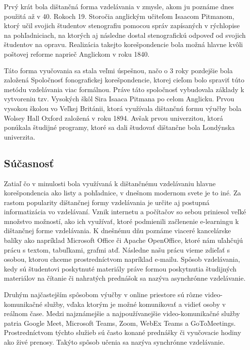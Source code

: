 \documentclass[10pt,twoside,slovak,a4paper]{article}
\begin{document}
	Prvý krát bola dištančná forma vzdelávania v zmysle, akom ju poznáme dnes použitá až v 40. Rokoch 19. Storočia anglickým učiteľom Isaacom Pitmanom, ktorý učil svojich študentov stenografiu pomocou správ zapísaných v rýchlopise na pohľadniciach, na ktorých aj následne dostal stenografickú odpoveď od svojich študentov na opravu. Realizácia takejto korešpondencie bola možná hlavne kvôli poštovej reforme naprieč Anglickom v roku 1840.
	
	Táto forma vyučovania sa stala veľmi úspešnou, načo o 3 roky pozdejšie bola založená Spoločnosť fonografickej korešpondencie, ktorej cieľom bolo spraviť túto metódu vzdelávania viac formálnou. Práve táto spoločnosť vybudovala základy k vytvoreniu tzv. Vysokých škôl Sira Isaaca Pitmana po celom Anglicku. Prvou vysokou školou vo Veľkej Británii, ktorá využívala dištančnú formu výučby bola Wolsey Hall Oxford založená v roku 1894. Avšak prvou univerzitou, ktorá ponúkala študijné programy, ktoré sa dali študovať dištančne bola Londýnska univerzita.
	
	\subsection{Súčasnosť}
	Zatiaľ čo v minulosti bola využívaná k dištančnému vzdelávaniu hlavne korešpondencia ako listy a pohľadnice, v dnešnom modernom svete je to iné. Za rastom popularity dištančnej formy vzdelávania je určite aj postupná informatizácia vo vzdelávaní. Vznik internetu a počítačov so sebou priniesol veľké množstvo možností, ako ich využívať, ktoré podmienili začlenenie e-learningu k dištančnej forme vzdelávania. K dnešnému dňu poznáme viaceré kancelárske balíky ako napríklad Microsoft Office či Apache OpenOffice, ktoré nám uľahčujú prácu s textom, tabuľkami, grafmi atď. Následne našu prácu vieme zdieľať s osobou, ktorou chceme prostredníctvom napríklad e-mailu. Spôsob vzdelávania, kedy sú študentovi poskytnuté materiály práve formou poskytnutia študijných materiálov na čítanie či nahratých prednášok sa nazýva asynchrónne vzdelávanie.
	
	Druhým najčastejším spôsobom výučby v online priestore sú rôzne video-komunikačné služby, vďaka ktorým je možné komunikovať a vidieť osoby v reálnom čase. Medzi najznámejšie a najpoužívanejšie video-komunikačné služby patria Google Meet, Microsoft Teams, Zoom, WebEx Teams a GoToMeetings. Prostredníctvom týchto služieb sú často konané prednášky či vyučovacie hodiny ako živé prenosy. Takýto spôsob učenia sa nazýva synchrónne vzdelávanie.
\end{document}
